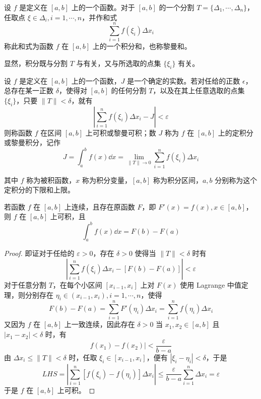 \begin{definition}
    设 $f$ 是定义在 $[a,b]$ 上的一个函数。对于 $[a,b]$ 的一个分割 $T=\{\Delta_1,\cdots,\Delta_n\}$，任取点 $\xi\in\Delta_i,i=1,\cdots,n$，并作和式
    $$\sum_{i=1}^nf(\xi_i)\Delta x_i$$
    称此和式为函数 $f$ 在 $[a,b]$ 上的一个积分和，也称黎曼和。
\end{definition}

显然，积分既与分割 $T$ 与有关，又与所选取的点集 $\{\xi_i\}$ 有关。

\begin{definition}
    设 $f$ 是定义在 $[a,b]$ 上的一个函数，$J$ 是一个确定的实数。若对任给的正数 $\epsilon$，总存在某一正数 $\delta$，使得对 $[a,b]$ 的任何分割 $T$，以及在其上任意选取的点集 $\{\xi_i\}$，只要 $\| T \| < \delta$，就有
    $$\left| \sum_{i=1}^nf(\xi_i)\Delta x_i - J \right| < \varepsilon$$
    则称函数 $f$ 在区间 $[a,b]$ 上可积或黎曼可积；数 $J$ 称为 $f$ 在 $[a,b]$ 上的定积分或黎曼积分，记作
    $$J = \int_a^b f(x) \dd x = \lim_{\| T \| \to 0} \sum_{i=1}^nf(\xi_i)\Delta x_i$$
\end{definition}

其中 $f$ 称为被积函数，$x$ 称为积分变量，$[a,b]$ 称为积分区间，$a,b$ 分别称为这个定积分的下限和上限。

\begin{theorem}
    若函数 $f$ 在 $[a,b]$ 上连续，且存在原函数 $F$，即 $F'(x) = f(x), x\in[a,b]$，则 $f$ 在 $[a,b]$ 上可积，且
    $$\int_a^bf(x)\dd x = F(b) - F(a)$$
\end{theorem}

\begin{proof}
    即证对于任给的 $\varepsilon > 0$，存在 $\delta>0$ 使得当 $\| T \| < \delta$ 时有
    $$\left| \sum_{i=1}^nf(\xi_i)\Delta x_i - [F(b)-F(a)] \right| < \varepsilon$$
    对于任意分割 $T$，在每个小区间 $[x_{i-1},x_i]$ 上对 $F(x)$ 使用 Lagrange 中值定理，则分别存在 $\eta_i \in (x_{i-1},x_i),i=1,\cdots,n$，使得
    $$F(b)-F(a) = \sum_{i=1}^n F'(\eta_i)\Delta x_i = \sum_{i=1}^nf(\eta_i)\Delta x_i$$
    又因为 $f$ 在 $[a,b]$ 上一致连续，因此存在 $\delta > 0$ 当 $x_1,x_2\in[a,b]$ 且 $|x_1-x_2| < \delta$ 时，有
    $$f(x_1) - f(x_2)| < \frac{\varepsilon}{b-a}$$
    由 $\Delta x_i \leqslant \| T \| < \delta$ 时，任取 $\xi_i \in [x_{i-1},x_i]$，便有 $|\xi_i-\eta_i|<\delta$，于是
    $$LHS = \left| \sum_{i=1}^n [f(\xi_i)-f(\eta_i)]\Delta x_i \right| \leqslant \frac{\varepsilon}{b-a}\sum_{i=1}^n\Delta x_i = \varepsilon$$
    于是 $f$ 在 $[a,b]$ 上可积。
\end{proof}

